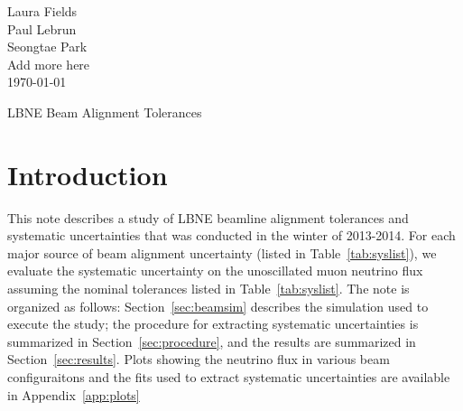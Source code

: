 



\begin{flushright}
Laura Fields\\
Paul Lebrun \\
Seongtae Park \\
Add more here \\
\today
\end{flushright}

\begin{center}

{\LARGE LBNE Beam Alignment Tolerances}
\end{center}



\section{Introduction}

This note describes a study of LBNE beamline alignment tolerances and systematic uncertainties that was conducted in the winter of 2013-2014.  For each major source of beam alignment uncertainty (listed in Table~\ref{tab:syslist}), we evaluate the systematic uncertainty on the unoscillated muon neutrino flux assuming the nominal tolerances listed in Table~\ref{tab:syslist}.   The note is organized as follows: Section~\ref{sec:beamsim} describes the simulation used to execute the study; the procedure for extracting systematic uncertainties is summarized in Section~\ref{sec:procedure}, and the results are summarized in Section~\ref{sec:results}.  Plots showing the neutrino flux in various beam configuraitons and the fits used to extract systematic uncertainties are available in Appendix~\ref{app:plots}

